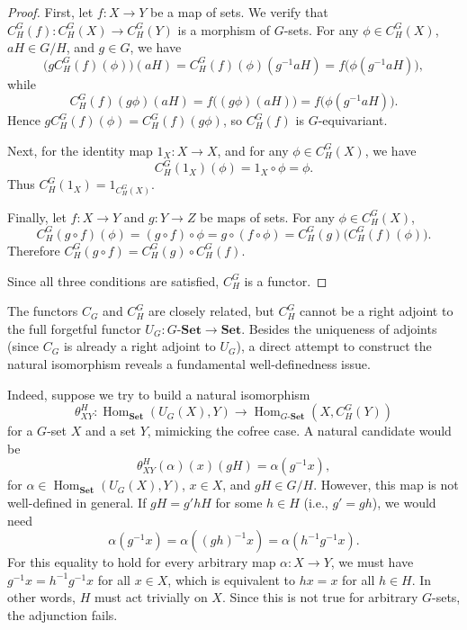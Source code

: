 \documentclass{amsart}
\begin{document}
\begin{proof}
First, let $f \colon X \longrightarrow Y$ be a map of sets. We verify that $C_H^G(f) \colon C_H^G(X) \longrightarrow C_H^G(Y)$ is a morphism of $G$-sets. For any $\phi \in C_H^G(X)$, $aH \in G/H$, and $g \in G$, we have
\[
\bigl(g C_H^G(f)(\phi)\bigr)(aH)
= C_H^G(f)(\phi)(g^{-1}aH)
= f\bigl(\phi(g^{-1}aH)\bigr),
\]
while
\[
C_H^G(f)(g \phi)(aH)
= f\bigl((g \phi)(aH)\bigr)
= f\bigl(\phi(g^{-1}aH)\bigr).
\]
Hence $g C_H^G(f)(\phi) = C_H^G(f)(g \phi)$, so $C_H^G(f)$ is $G$-equivariant.

Next, for the identity map $1_X \colon X \longrightarrow X$, and for any $\phi \in C_H^G(X)$, we have
\[
C_H^G(1_X)(\phi) = 1_X \circ \phi = \phi.
\]
Thus $C_H^G(1_X) = 1_{C_H^G(X)}$.

Finally, let $f \colon X \longrightarrow Y$ and $g \colon Y \longrightarrow Z$ be maps of sets. For any $\phi \in C_H^G(X)$,
\[
C_H^G(g \circ f)(\phi) = (g \circ f) \circ \phi = g \circ (f \circ \phi) = C_H^G(g)\bigl(C_H^G(f)(\phi)\bigr).
\]
Therefore $C_H^G(g \circ f) = C_H^G(g) \circ C_H^G(f)$.

Since all three conditions are satisfied, $C_H^G$ is a functor.
\end{proof}

The functors $C_G$ and $C_H^G$ are closely related, but $C_H^G$ cannot be a right adjoint to the full forgetful functor $U_G \colon G\text{-}\mathbf{Set} \rightarrow \mathbf{Set}$. 
Besides the uniqueness of adjoints (since $C_G$ is already a right adjoint to $U_G$), a direct attempt to construct the natural isomorphism reveals a fundamental well-definedness issue.

Indeed, suppose we try to build a natural isomorphism
\[
\theta^H_{XY} \colon \operatorname{Hom}_{\mathbf{Set}}(U_G(X), Y) 
\longrightarrow \operatorname{Hom}_{G\text{-}\mathbf{Set}}(X, C_H^G(Y))
\]
for a $G$-set $X$ and a set $Y$, mimicking the cofree case. A natural candidate would be
\[
\theta^H_{XY}(\alpha)(x)(gH) = \alpha(g^{-1}x),
\]
for $\alpha \in \operatorname{Hom}_{\mathbf{Set}}(U_G(X), Y)$, $x \in X$, and $gH \in G/H$. However, this map is not well-defined in general. If $gH = g'hH$ for some $h \in H$ (i.e., $g' = gh$), we would need
\[
\alpha(g^{-1}x) = \alpha((gh)^{-1}x) = \alpha(h^{-1}g^{-1}x).
\]
For this equality to hold for every arbitrary map $\alpha \colon X \rightarrow Y$, we must have $g^{-1}x = h^{-1}g^{-1}x$ for all $x \in X$, which is equivalent to $h x = x$ for all $h \in H$. In other words, $H$ must act trivially on $X$. Since this is not true for arbitrary $G$-sets, the adjunction fails.
\end{document}
